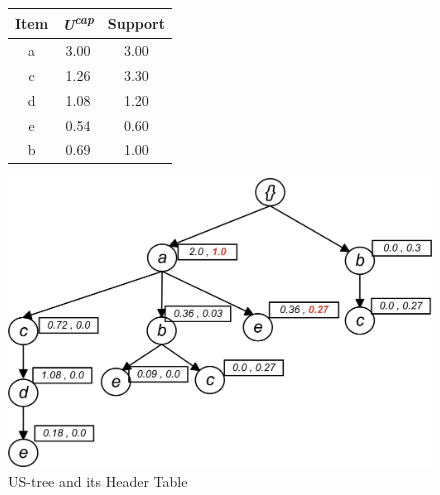 %

\begin{figure}
\begin{minipage}{0.40\textwidth}
  \centering
  
	\begin{center}
	\begin{tabular}{ |c|c|c| } 
 	\hline
 		Item&\emph{U\textsuperscript{cap}}&Support\\ \hline\hline
 		a &  3.00  & 3.00	\\ \hline
 		c &  1.26  & 3.30	\\ \hline
 		d &  1.08  & 1.20	\\ \hline
 		e &  0.54  & 0.60	\\ \hline
 		b &  0.69  & 1.00	\\ \hline
\end{tabular}
\end{center}   
\end{minipage}
\hfill
\begin{minipage}{0.40\textwidth}
  \centering
  \includegraphics[width=\textwidth]{images/sim_06.jpg}
\end{minipage}
\caption{US-tree and its Header Table}
\label{figure:min_before}
\end{figure}


